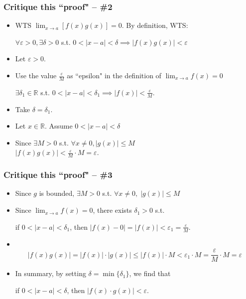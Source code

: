 \documentclass[14pt]{beamer}
\begin{document}
\begin{frame}[t]
	\frametitle{Critique this ``proof" -- \#2}
	\fontsize{13}{13}\selectfont
	\begin{itemize}
		\item WTS $\displaystyle \lim_{x \to a}\left[f(x) g(x) \right] =0$. By
			definition, WTS:

			\hfill $\displaystyle \forall \varepsilon>0, \exists \delta>0$ s.t.
			$\displaystyle 0<|x-a|<\delta \implies |f(x) g(x)|<\varepsilon$
			\vfill

		\item Let $\varepsilon >0$.
			\vfill

		\item Use the value $\displaystyle \frac{\varepsilon}{M}$ as ``epsilon" in
			the definition of $\displaystyle \lim_{x \to a}f(x) = 0$

			\hfill $\displaystyle \exists \delta_{1}\in \mathbb{R}$ s.t.
			$\displaystyle 0<|x-a|<\delta_{1}\implies |f(x)| < \frac{\varepsilon}{M}$.
			\vfill

		\item Take $\displaystyle \delta = \delta_{1}$.
			\vfill

		\item Let $\displaystyle x \in \mathbb{R}$. Assume
			$\displaystyle 0 < |x-a| <\delta$
			\vfill

		\item Since $\displaystyle \exists M>0$ s.t.
			$\displaystyle \forall x \neq 0, |g(x)| \leq M$ \\ \hfill
			$\displaystyle |f(x) g(x)| < \frac{\varepsilon}{M}\cdot M = \varepsilon$.
			\vfill
	\end{itemize}
\end{frame}

\begin{frame}[t]
	\frametitle{Critique this ``proof" -- \#3}
	\fontsize{13}{13}\selectfont
	\begin{itemize}
		\item Since $g$ is bounded, $\displaystyle \exists M >0$ \; s.t. \; \;$\displaystyle
			\forall x \neq 0, \; |g(x)| \leq M$
			\vfill

		\item Since $\displaystyle \lim_{x \to a}f(x)=0$, there exists
			$\displaystyle \delta_{1}>0$ s.t.

			if $\displaystyle 0<|x-a|<\delta_{1}$, \quad then \; $\displaystyle |f(x)-0
			| = |f(x)| <\varepsilon_{1}= \frac{\varepsilon}{M}$.
			\vfill

		\item \
			\vspace{-1cm}
			\[
				|f(x)g(x)| = |f(x)| \cdot |g(x)| \leq |f(x)| \cdot M < \varepsilon_{1}\cdot
				M = \frac{\varepsilon}{M}\cdot M = \varepsilon
			\]

		\item In summary, by setting $\displaystyle \delta = \min\{\delta_{1}\}$, we
			find that

			if $\displaystyle 0<|x-a|<\delta$, \quad then \; $\displaystyle |f(x) \cdot
			g(x)| < \varepsilon$.
			\vfill
	\end{itemize}
\end{frame}
\end{document}
